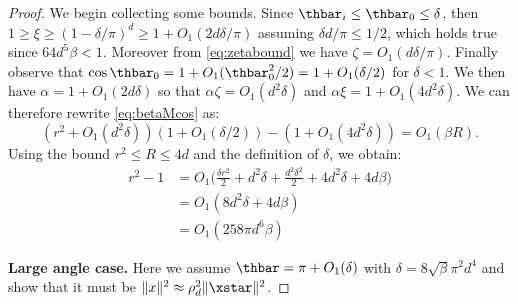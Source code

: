 \begin{proof}
	\noindent We begin collecting some bounds. 
	Since $\thbar_i \leq \thbar_0 \leq \delta$, then $1 \geq \xi \geq (1 - \delta/\pi)^d \geq 1 + O_1(2 d \delta / \pi)$ assuming $\delta d/ \pi \leq 1/2$, which holds true since $64 d^5 \beta < 1$. Moreover from \eqref{eq:zetabound} we have $\zeta = O_1(d \delta/\pi)$.
	Finally observe that $\cos \thbar_0 = 1 + O_1(\thbar_0^2/2) = 1 + O_1(\delta/2)$ for $\delta < 1$.
	We then have $\alpha = 1 + O_1(2 d \delta)$
	so that $\alpha \zeta = O_1(d^2 \delta)$  and $\alpha \xi = 1 + O_1(4 d^2 \delta)$. We can therefore 
	rewrite \eqref{eq:betaMcos} as:
	\[
	(r^2 + O_1(d^2 \delta)) (1 + O_1({\delta}/{2})) - (1 + O_1(4 d^2 \delta)) = O_1(\beta R).
	\]
	Using the bound $r^2 \leq R \leq 4 d$ and the definition of $\delta$, we obtain:
	\begin{equation}\label{eq:small_r2}
	\begin{aligned}
	r^2 - 1 &= O_1\Big(\frac{\delta r^2}{2} + d^2 \delta +  \frac{d^2 \delta^2}{2} + 4 d^2 \delta + 4  d \beta \Big) \\
	&= O_1(8 d^2 \delta + 4 d \beta) \\
	&= O_1(258 \pi d^6 \beta)
	\end{aligned}
	\end{equation}
	\medskip
	
	\noindent\textbf{Large angle case.}	 
	Here we assume $\thbar = \pi + O_1(\delta)$ with $\delta = 8 \sqrt{\beta} \pi^2 d^4$ and show 
	that it must be $\| x \|^2 \approx \rho_d^2  \| \xstar \|^2$.
	

\end{proof}

